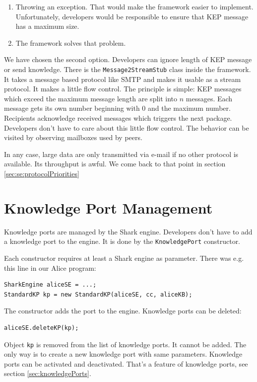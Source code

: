\begin{enumerate}
    \item Throwing an exception. That would make the framework easier to implement. Unfortunately, developers would be responsible to ensure that KEP message has a maximum size.
\item The framework solves that problem. 
\end{enumerate}

We have chosen the second option. Developers can ignore length of KEP message or send knowledge. There is the {\tt Message2StreamStub} class inside the framework. It takes a message based protocol like SMTP and makes it usable as a stream protocol. It makes a little flow control. The principle is simple: KEP messages which exceed the maximum message length are split into $n$ messages. Each message gets its own number beginning with 0 and the maximum number. Recipients acknowledge received messages which triggers the next package. Developers don't have to care about this little flow control. The behavior can be visited by observing mailboxes used by peers.

In any case, large data are only transmitted via e-mail if no other protocol is available. Its throughput is awful. We come back to that point in section \ref{sec:se:protocolPriorities}

\section{Knowledge Port Management}
Knowledge ports are managed by the Shark engine. Developers don't have to add a knowledge port to the engine. It is done by the {\tt KnowledgePort} constructor.

Each constructor requires at least a Shark engine as parameter. There was e.g. this line in our Alice program:

\begin{verbatim}
SharkEngine aliceSE = ...;
StandardKP kp = new StandardKP(aliceSE, cc, aliceKB);
\end{verbatim}   

The constructor adds the port to the engine. Knowledge ports can be deleted:

\begin{verbatim}
aliceSE.deleteKP(kp);
\end{verbatim}

Object {\tt kp} is removed from the list of knowledge ports. It cannot be added. The only way is to create a new knowledge port with same parameters. Knowledge ports can be activated and deactivated. That's a feature of knowledge ports, see section \ref{sec:knowledgePorts}.

